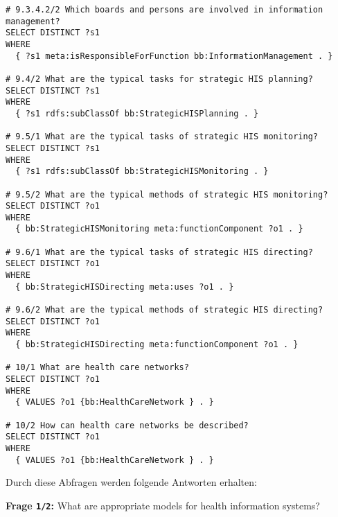 \begin{lstlisting}[language=SPARQL]
# 9.3.4.2/2 Which boards and persons are involved in information management?
SELECT DISTINCT ?s1
WHERE
  { ?s1 meta:isResponsibleForFunction bb:InformationManagement . }

# 9.4/2 What are the typical tasks for strategic HIS planning?
SELECT DISTINCT ?s1
WHERE
  { ?s1 rdfs:subClassOf bb:StrategicHISPlanning . }

# 9.5/1 What are the typical tasks of strategic HIS monitoring?
SELECT DISTINCT ?s1
WHERE
  { ?s1 rdfs:subClassOf bb:StrategicHISMonitoring . }

# 9.5/2 What are the typical methods of strategic HIS monitoring?
SELECT DISTINCT ?o1
WHERE
  { bb:StrategicHISMonitoring meta:functionComponent ?o1 . }

# 9.6/1 What are the typical tasks of strategic HIS directing?
SELECT DISTINCT ?o1
WHERE
  { bb:StrategicHISDirecting meta:uses ?o1 . }

# 9.6/2 What are the typical methods of strategic HIS directing?
SELECT DISTINCT ?o1
WHERE
  { bb:StrategicHISDirecting meta:functionComponent ?o1 . }

# 10/1 What are health care networks?
SELECT DISTINCT ?o1
WHERE
  { VALUES ?o1 {bb:HealthCareNetwork } . }

# 10/2 How can health care networks be described?
SELECT DISTINCT ?o1
WHERE
  { VALUES ?o1 {bb:HealthCareNetwork } . }

\end{lstlisting}

Durch diese Abfragen werden folgende Antworten erhalten:

\textbf{Frage \texttt{1/2}:} What are appropriate models for health information systems?

